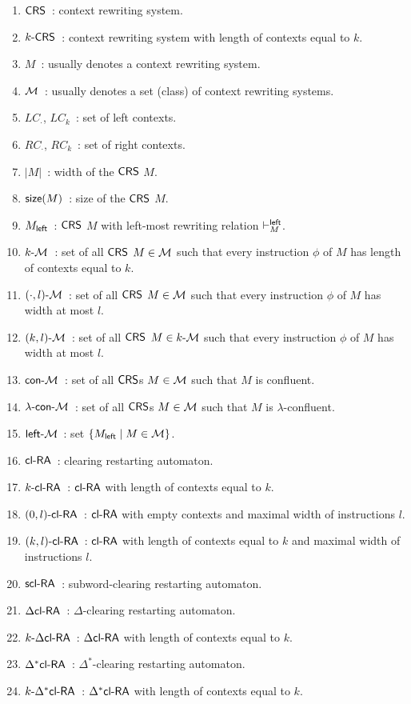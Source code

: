 \begin{enumerate}[]
\item $\CRS$\ : context rewriting system.
\item $\kCRS$\ : context rewriting system with length of contexts equal to $k$.
\item $M$\ : usually denotes a context rewriting system.
\item $\calM$\ : usually denotes a set (class) of context rewriting systems.
\item $LC_{\cdot}$, $LC_k$\ : set of left contexts.
\item $RC_{\cdot}$, $RC_k$\ : set of right contexts.
\item $|M|$\ : width of the $\CRS$ $M$.
\item $\size(M)$\ : size of the $\CRS$ $M$.
\item $M_{\sf left}$\ : $\CRS$ $M$ with left-most rewriting relation $\vdash^{\sf left}_M$.
\item $\kcalM$\ : set of all $\CRS$ $M \in \calM$ such that every instruction $\phi$ of $M$ has length of contexts equal to $k$.
\item $\llcalM$\ : set of all $\CRS$ $M \in \calM$ such that every instruction $\phi$ of $M$ has width at most $l$.
\item $\klcalM$\ : set of all $\CRS$ $M \in \kcalM$ such that every instruction $\phi$ of $M$ has width at most $l$.
\item $\concalM$\ : set of all $\CRS$s $M \in \calM$ such that $M$ is confluent.
\item $\lconcalM$\ : set of all $\CRS$s $M \in \calM$ such that $M$ is $\lambda$-confluent.
\item $\leftcalM$\ : set $\{M_{\sf left} \mid M \in \calM\}$.
\item $\clRA$\ : clearing restarting automaton.
\item $\kclRA$\ : $\clRA$ with length of contexts equal to $k$.
\item $\zlclRA$\ : $\clRA$ with empty contexts and maximal width of instructions $l$.
\item $\klclRA$\ : $\clRA$ with length of contexts equal to $k$ and maximal width of instructions $l$.
\item $\sclRA$\ : subword-clearing restarting automaton.
\item $\DclRA$\ : $\Delta$-clearing restarting automaton.
\item $\kDclRA$\ : $\DclRA$ with length of contexts equal to $k$.
\item $\DXclRA$\ : $\Delta^*$-clearing restarting automaton.
\item $\kDXclRA$\ : $\DXclRA$ with length of contexts equal to $k$. 
\end{enumerate}

